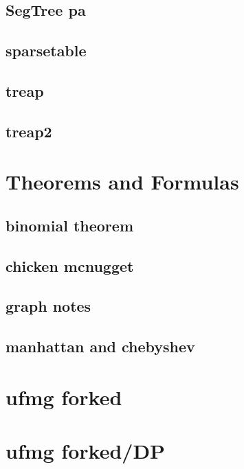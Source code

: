 \subsection{SegTree pa}
\raggedbottom
\hrulefill
\subsection{sparsetable}
\raggedbottom
\hrulefill
\subsection{treap}
\raggedbottom
\hrulefill
\subsection{treap2}
\raggedbottom
\hrulefill

\section{Theorems and Formulas}
\subsection{binomial theorem}
\raggedbottom
\hrulefill
\subsection{chicken mcnugget}
\raggedbottom
\hrulefill
\subsection{graph notes}
\raggedbottom
\hrulefill
\subsection{manhattan and chebyshev}
\raggedbottom
\hrulefill

\section{ufmg forked}

\section{ufmg forked/DP}
